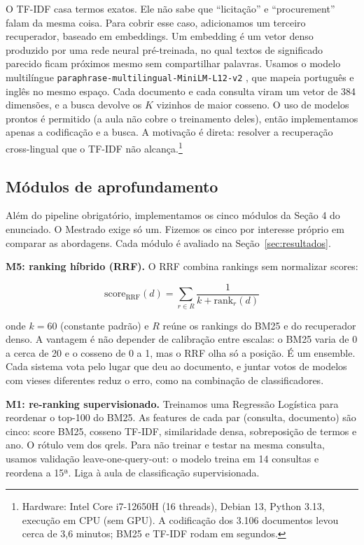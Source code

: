 \documentclass[12pt]{article}
\begin{document}
O TF-IDF casa termos exatos. Ele não sabe que ``licitação'' e ``procurement'' falam da mesma coisa. Para cobrir esse caso, adicionamos um terceiro recuperador, baseado em embeddings. Um embedding é um vetor denso produzido por uma rede neural pré-treinada, no qual textos de significado parecido ficam próximos mesmo sem compartilhar palavras. Usamos o modelo multilíngue \texttt{paraphrase-multilingual-MiniLM-L12-v2} \cite{reimers2019}, que mapeia português e inglês no mesmo espaço. Cada documento e cada consulta viram um vetor de 384 dimensões, e a busca devolve os $K$ vizinhos de maior cosseno. O uso de modelos prontos é permitido (a aula não cobre o treinamento deles), então implementamos apenas a codificação e a busca. A motivação é direta: resolver a recuperação cross-lingual que o TF-IDF não alcança.\footnote{Hardware: Intel Core i7-12650H (16 threads), Debian 13, Python 3.13, execução em CPU (sem GPU). A codificação dos 3.106 documentos levou cerca de 3,6 minutos; BM25 e TF-IDF rodam em segundos.}

\subsection{Módulos de aprofundamento}

Além do pipeline obrigatório, implementamos os cinco módulos da Seção 4 do enunciado. O Mestrado exige só um. Fizemos os cinco por interesse próprio em comparar as abordagens. Cada módulo é avaliado na Seção~\ref{sec:resultados}.

\textbf{M5: ranking híbrido (RRF).} O RRF \cite{cormack2009} combina rankings sem normalizar scores:

\begin{equation}
\text{score}_{\text{RRF}}(d) = \sum_{r \in R} \frac{1}{k + \text{rank}_r(d)}
\end{equation}

onde $k=60$ (constante padrão) e $R$ reúne os rankings do BM25 e do recuperador denso. A vantagem é não depender de calibração entre escalas: o BM25 varia de 0 a cerca de 20 e o cosseno de 0 a 1, mas o RRF olha só a posição. É um ensemble. Cada sistema vota pelo lugar que deu ao documento, e juntar votos de modelos com vieses diferentes reduz o erro, como na combinação de classificadores.

\textbf{M1: re-ranking supervisionado.} Treinamos uma Regressão Logística para reordenar o top-100 do BM25. As features de cada par (consulta, documento) são cinco: score BM25, cosseno TF-IDF, similaridade densa, sobreposição de termos e ano. O rótulo vem dos qrels. Para não treinar e testar na mesma consulta, usamos validação leave-one-query-out: o modelo treina em 14 consultas e reordena a 15ª. Liga à aula de classificação supervisionada.
\end{document}
